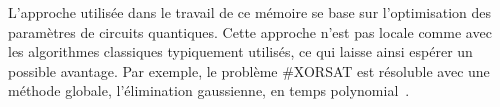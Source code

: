 L'approche utilisée dans le travail de ce mémoire se base sur l'optimisation des paramètres de circuits quantiques. Cette approche n'est pas locale comme avec les algorithmes classiques typiquement utilisés, ce qui laisse ainsi espérer un possible avantage. Par exemple, le problème \#XORSAT est résoluble avec une méthode globale, l'élimination gaussienne, en temps polynomial~\cite{mooreNatureComputation2011}.
